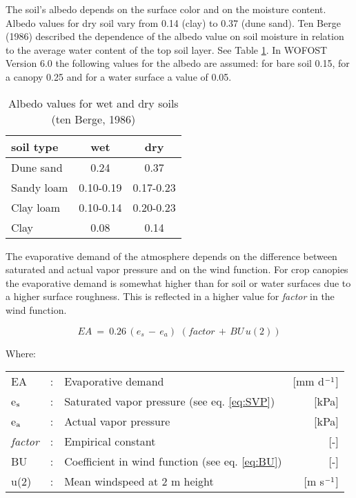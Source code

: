 The soil's albedo depends on the surface color and on the moisture content. Albedo
values for dry soil vary from 0.14 (clay) to 0.37 (dune sand). Ten Berge (1986) described
the depen\-dence of the albedo value on soil moisture in relation to the average water
content of the top soil layer. See Table \ref{tab:AlbedoSoils}. 
In WOFOST Version 6.0 the following values for the albedo are assumed: for bare soil
0.15, for a canopy  0.25 and for a water surface a value of 0.05.

\begin{table}
\centering
\caption{Albedo values for wet and dry soils (ten Berge, 1986)}
\label{tab:AlbedoSoils}
\begin{tabular}{lcc}
\hline
soil type & wet & dry\\
\hline
Dune sand  &   0.24 &  0.37 \\
Sandy loam &    0.10-0.19 &  0.17-0.23\\
Clay loam &    0.10-0.14 &  0.20-0.23\\
Clay &    0.08 &  0.14\\
\hline
\end{tabular}
\end{table}

The evaporative demand of the atmosphere depends on the difference between saturated
and actual vapor pressure and on the wind function. For crop canopies the evaporative
demand is somewhat higher than for soil or water surfaces due to a higher surface
roughness. This is reflected in a higher value for {\it factor} in the wind function.

\begin{equation}
\label{eq:EvapDemand}
EA~=~0.26\, (e _{s} \, -\, e _{a} )\,\, (factor\, +\, BU\, u(2))
\end{equation}
 
Where:\\[5pt]
\begin{tabularx}{\textwidth}{llXr}
EA &:& Evaporative demand  & [mm d$^{{\rm -1}}$]\\
e$_{{\rm s}}$ &:& Saturated vapor pressure (see eq. \ref{eq:SVP})  & [kPa]\\
e$_{{\rm a}}$ &:& Actual vapor pressure  & [kPa]\\
{\it factor} &:& Empirical constant  & [-]\\
BU &:& Coefficient in wind function (see eq. \ref{eq:BU})  & [-]\\
u(2) &:& Mean windspeed at 2 m height  & [m s$^{{\rm -1}}$]\\
\end{tabularx}

